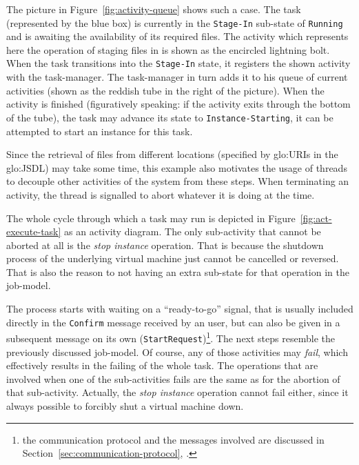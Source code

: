 The picture in Figure~\ref{fig:activity-queue} shows such a case. The task
(represented  by  the blue  box)  is  currently  in the  \texttt{Stage-In}
sub-state  of \texttt{Running}  and is  awaiting the  availability  of its
required  files.  The  activity  which represents  here  the operation  of
staging files in is shown as  the encircled lightning bolt.  When the task
transitions  into  the \texttt{Stage-In}  state,  it  registers the  shown
activity with  the task-manager. The task-manager  in turn adds  it to his
queue of current activities (shown as the reddish tube in the right of the
picture).  When  the activity is  finished (figuratively speaking:  if the
activity exits through  the bottom of the tube), the  task may advance its
state to \texttt{Instance-Starting},  \ie it can be attempted  to start an
instance for this task.

Since  the  retrieval of  files  from  different  locations (specified  by
\gls{glo:URI}s  in the \gls{glo:JSDL})  may take  some time,  this example
also motivates  the usage of threads  to decouple other  activities of the
system  from these  steps. When  terminating  an activity,  the thread  is
signalled to abort whatever it is doing at the time.

\bigskip

The  whole   cycle  through   which  a  task   may  run  is   depicted  in
Figure~\ref{fig:act-execute-task}  as  an   activity  diagram.   The  only
sub-activity that  cannot be  aborted at all  is the  \emph{stop instance}
operation. That is because the  shutdown process of the underlying virtual
machine just cannot  be cancelled or reversed. That is  also the reason to
not having an extra sub-state for that operation in the job-model.

The  process starts  with waiting  on  a ``ready-to-go''  signal, that  is
usually included  directly in the \texttt{Confirm} message  received by an
user,  but  can  also  be  given  in  a  subsequent  message  on  its  own
(\texttt{Start\-Request})\footnote{the  communication   protocol  and  the
  messages           involved          are           discussed          in
  Section~\ref{sec:communication-protocol},
  \emph{}.}.  The  next steps resemble
the previously discussed job-model. Of course, any of those activities may
\emph{fail}, which effectively  results in the failing of  the whole task.
The operations that are involved  when one of the sub-activities fails are
the  same  as  for  the  abortion of  that  sub-activity.   Actually,  the
\emph{stop  instance}  operation  cannot  fail  either,  since  it  always
possible to forcibly shut a virtual machine down.

